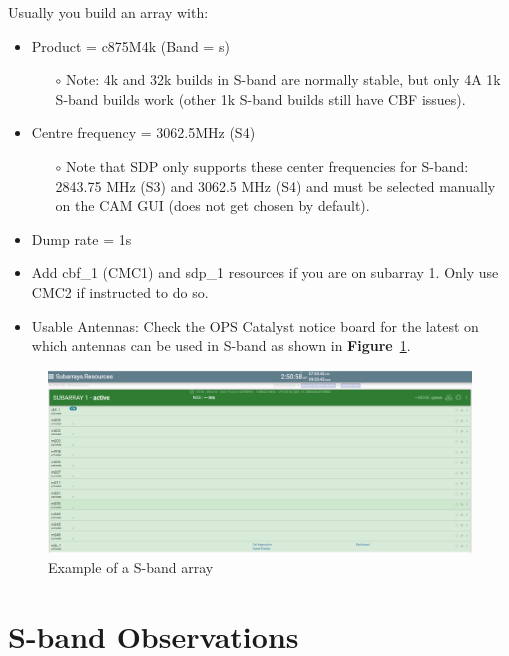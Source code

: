 Usually you build an array with:
\begin{itemize}
 

\item  Product = c875M4k (Band = s)
\begin{itemize}
\item[$\circ$]Note: 4k and 32k builds in S-band are normally stable, but only 4A 1k S-band builds work (other 1k S-band builds still have CBF issues).
\end{itemize}
\item  Centre frequency = 3062.5MHz (S4)
\begin{itemize}
\item[$\circ$] Note that SDP only supports these center frequencies for S-band: 2843.75 MHz (S3) and 3062.5 MHz (S4) and must be selected manually on the CAM GUI (does not get chosen by default).
\end{itemize}
\item Dump rate = 1s
\item Add cbf\_1 (CMC1) and sdp\_1 resources if you are on subarray 1. Only use CMC2 if instructed to do so.
\item Usable Antennas: Check the OPS Catalyst notice board for the latest on which antennas can be used in S-band  as shown in \textbf{Figure}~\ref{fig:image113}.

\end{itemize}

\begin{figure}[!thb]
	\centering
	\includegraphics[scale=0.27]{Chapters/images/image113.png}
	
	\caption{Example of a S-band array}
	\label{fig:image113}
\end{figure}



\section{ S-band Observations}
